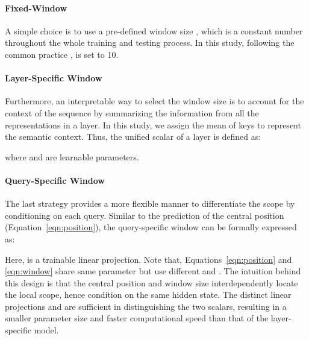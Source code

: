 \documentclass[11pt,a4paper]{article}
\begin{document}
\paragraph{\bf Fixed-Window} 


A simple choice is to use a pre-defined window size , which is a constant number throughout the whole training and testing process. In this study, following the common practice \cite{luong2015effective},  is set to 10.

\iffalse  
\paragraph{\bf Unified-Specific Window} 
Since the local range may differ between attention heads, the suitable window size for each head is more flexible. As a result, we assigned the scalar  as a trainable parameter, namely: 
     
  where  is a pre-defined constant number and in this work we set , which is the maximum sentence length. 
 \fi
 
 
\paragraph{\bf Layer-Specific Window} 
  
Furthermore, an interpretable way to select the window size is to account for the context of the sequence by summarizing the information from all the representations in a layer. In this study, we assign the mean of keys  to represent the semantic context. Thus, the unified scalar  of a layer  is defined as:

 
  where  and  are learnable parameters.


\paragraph{\bf Query-Specific Window} 
The last strategy provides a more flexible manner to differentiate the scope by conditioning on each query. Similar to the prediction of the central position (Equation~\ref{eqn:position}), the query-specific window can be formally expressed as:
 
Here,  is a trainable linear projection. Note that, Equations~\ref{eqn:position} and \ref{eqn:window} share same parameter  but use different  and .  The intuition behind this design is that the central position and window size interdependently locate the local scope, hence condition on the same hidden state. The distinct linear projections  and  are sufficient in distinguishing the two scalars, resulting in a smaller parameter size and faster computational speed than that of the layer-specific model.
\end{document}
